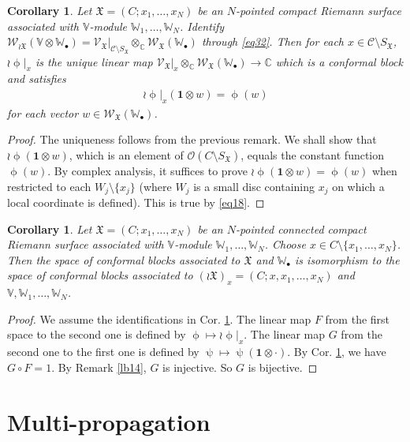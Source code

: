 \documentclass[12pt,a4paper,notitlepage]{article}
\theoremstyle{definition}
\theoremstyle{plain}
\newtheorem{co}[df]{Corollary}
\newcommand{\fk}{\mathfrak}
\newcommand{\mc}{\mathcal}
\newcommand{\id}{\mathbf{1}}
\newcommand{\scr}{\mathscr}
\newcommand{\SX}{{S_{\fk X}}}
\newcommand{\blt}{\bullet}
\newcommand{\Vbb}{\mathbb V}
\newcommand{\Wbb}{\mathbb W}
\newcommand{\Cbb}{\mathbb C}
\numberwithin{equation}{section}
\begin{document}
\begin{co}\label{lb13}
Let $\fk X=(C;x_1,\dots,x_N)$ be an $N$-pointed compact Riemann surface associated with $\Vbb$-module $\Wbb_1,\dots,\Wbb_N$. Identify $\scr W_{\wr\fk X}(\Vbb\otimes\Wbb_\blt)=\scr V_{\fk X}\big|_{\mc C\setminus\SX}\otimes_\Cbb\scr W_{\fk X}(\Wbb_\blt)$ through \eqref{eq32}. Then for each $x\in\mc C\setminus\SX$, $\wr\upphi|_x$ is the unique linear map $\scr V_{\fk X}\big|_x\otimes_\Cbb\scr W_{\fk X}(\Wbb_\blt)\rightarrow\Cbb$ which is a conformal block and satisfies
\begin{align*}
\wr\upphi|_x(\id\otimes w)=\upphi(w)	
\end{align*}
for each vector $w\in\scr W_{\fk X}(\Wbb_\blt)$.
\end{co}

\begin{proof}
The uniqueness follows from the previous remark. We shall show that $\wr\upphi(\id\otimes w)$, which is an element of $\scr O(C\setminus\SX)$, equals the constant function $\upphi(w)$. By complex analysis, it suffices to prove $\wr\upphi(\id\otimes w)=\upphi(w)$ when restricted to each $W_j\setminus\{x_j\}$ (where $W_j$ is a small disc containing $x_j$ on which a local coordinate is defined). This is true by \eqref{eq18}.
\end{proof}

\begin{co}
Let $\fk X=(C;x_1,\dots,x_N)$ be an $N$-pointed connected compact Riemann surface associated with $\Vbb$-module $\Wbb_1,\dots,\Wbb_N$. Choose $x\in C\setminus\{x_1,\dots,x_N\}$. Then the space of conformal blocks associated to $\fk X$ and $\Wbb_\blt$ is isomorphism to the space of conformal blocks associated to $(\wr\fk X)_x=(C;x,x_1,\dots,x_N)$ and $\Vbb,\Wbb_1,\dots,\Wbb_N$.
\end{co}

\begin{proof}
We assume the identifications in Cor. \ref{lb13}. The linear map $F$ from the first space to the second one is defined by $\upphi\mapsto\wr\upphi|_x$. The linear map $G$ from the second one to the first one is defined by $\uppsi\mapsto\uppsi(\id\otimes\cdot)$. By Cor. \ref{lb13}, we have $G\circ F=1$. By Remark \ref{lb14}, $G$ is injective. So $G$ is bijective.
\end{proof}





\section{Multi-propagation}\label{lb20}
\end{document}
